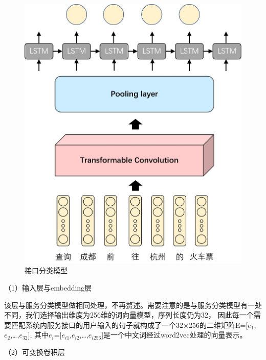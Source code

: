 \begin{figure}[htbp]
  \centering
  \includegraphics[scale=0.4]{./images/tran-cnn-lstm.jpg}
  \caption{接口分类模型}
  \label{fig:tran-cnn-lstm}
\end{figure}
（1）输入层与embedding层

该层与服务分类模型做相同处理，不再赘述。需要注意的是与服务分类模型有一处不同，我们选择输出维度为256维的词向量模型，序列长度仍为32，
因此每一个需要匹配系统内服务接口的用户输入的句子就构成了一个32×256的二维矩阵E=[$e_{1}$,$e_{2}$,\dots,$e_{32}$],
其中$e_{i}$=[$e_{i1}$,$e_{i2}$,\dots,$e_{i256}$]是一个中文词经过word2vec处理的向量表示。

（2）可变换卷积层

